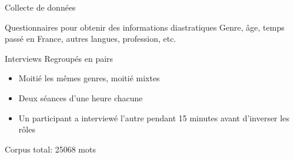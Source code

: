 \documentclass{beamer}
\begin{document}
    \begin{frame}{Collecte de données}
      \begin{block}{Questionnaires pour obtenir des informations diastratiques}
        Genre, âge, temps passé en France, autres langues, profession, etc.
      \end{block}
      \begin{block}{Interviews}
        Regroupés en pairs
        \begin{itemize}
          \item Moitié les mêmes genres, moitié mixtes
          \item Deux séances d'une heure chacune
          \item Un participant a interviewé l'autre pendant 15 minutes avant d'inverser les rôles
        \end{itemize}
      \end{block}
      \begin{block}{}
        Corpus total: 25068 mots
      \end{block}
    \end{frame}
\end{document}

